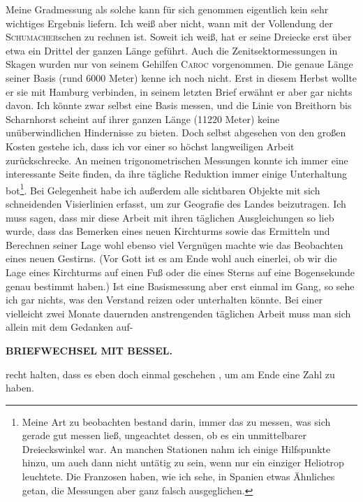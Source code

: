 \par\noindent\hspace*{\parindent}Meine Gradmessung als solche kann für sich genommen eigentlich kein sehr wichtiges Ergebnis liefern. Ich weiß aber nicht, wann mit der Vollendung der \textsc{Schumacher}schen zu rechnen ist.
Soweit ich weiß, hat er seine Dreiecke erst über etwa ein Drittel der ganzen Länge geführt. Auch die Zenitsektormessungen in Skagen wurden nur von seinem Gehilfen \textsc{Caroc} vorgenommen.
Die genaue Länge seiner Basis (rund 6000 Meter) kenne ich noch nicht. Erst in diesem Herbst wollte er sie mit Hamburg verbinden, in seinem letzten Brief erwähnt er aber gar nichts davon.
Ich könnte zwar selbst eine Basis messen, und die Linie von Breithorn bis Scharnhorst scheint auf ihrer ganzen Länge (11220 Meter) keine unüberwindlichen Hindernisse zu bieten.
Doch selbst abgesehen von den großen Kosten gestehe ich, dass ich vor einer so höchst langweiligen Arbeit zurückschrecke.
An meinen trigonometrischen Messungen konnte ich immer eine interessante Seite finden, da ihre tägliche Reduktion immer einige Unterhaltung bot\footnote{Meine Art zu beobachten bestand darin, immer das zu messen, was sich gerade gut messen ließ, ungeachtet dessen, ob es ein unmittelbarer Dreieckswinkel war. An manchen Stationen nahm ich einige Hilfspunkte hinzu, um auch dann nicht untätig zu sein, wenn nur ein einziger Heliotrop leuchtete. Die Franzosen haben, wie ich sehe, in Spanien etwas Ähnliches getan, die Messungen aber ganz falsch ausgeglichen.}.
Bei Gelegenheit habe ich außerdem alle sichtbaren Objekte mit sich schneidenden Visierlinien erfasst, um zur Geografie des Landes beizutragen. Ich muss sagen, dass mir diese Arbeit mit ihren täglichen Ausgleichungen so lieb wurde, dass das Bemerken eines neuen Kirchturms sowie das Ermitteln und Berechnen seiner Lage wohl ebenso viel Vergnügen machte wie das Beobachten eines neuen Gestirns.
(Vor Gott ist es am Ende wohl auch einerlei, ob wir die Lage eines Kirchturms auf einen Fuß oder die eines Sterns auf eine Bogensekunde genau bestimmt haben.)
Ist eine Basismessung aber erst einmal im Gang, so sehe ich gar nichts, was den Verstand reizen oder unterhalten könnte. Bei einer vielleicht zwei Monate dauernden anstrengenden täglichen Arbeit muss man sich allein mit dem Gedanken auf-
\par\clearpage
{}\hfill{\small\textbf{BRIEFWECHSEL MIT BESSEL.}}\par\medskip
\noindent recht halten, dass es eben doch einmal geschehen , um am Ende eine Zahl zu haben.

